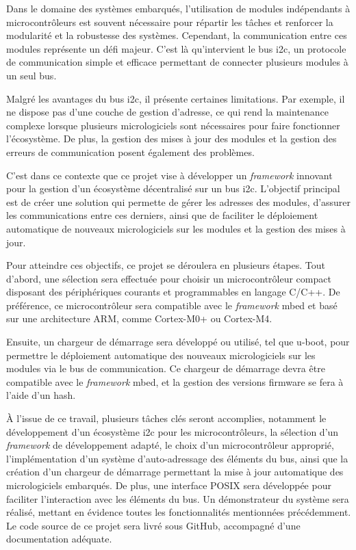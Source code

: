 Dans le domaine des systèmes embarqués, l'utilisation de modules indépendants à microcontrôleurs est souvent nécessaire pour répartir les tâches et renforcer la modularité et la robustesse des systèmes.
Cependant, la communication entre ces modules représente un défi majeur.
C'est là qu'intervient le bus \gls{i2c}, un protocole de communication simple et efficace permettant de connecter plusieurs modules à un seul bus.

Malgré les avantages du bus \gls{i2c}, il présente certaines limitations.
Par exemple, il ne dispose pas d'une couche de gestion d'adresse, ce qui rend la maintenance complexe lorsque plusieurs micrologiciels sont nécessaires pour faire fonctionner l'écosystème.
De plus, la gestion des mises à jour des modules et la gestion des erreurs de communication posent également des problèmes.

C'est dans ce contexte que ce projet vise à développer un \textit{\gls{framework}} innovant pour la gestion d'un écosystème décentralisé sur un bus \gls{i2c}.
L'objectif principal est de créer une solution qui permette de gérer les adresses des modules, d'assurer les communications entre ces derniers, ainsi que de faciliter le déploiement automatique de nouveaux micrologiciels sur les modules et la gestion des mises à jour.

Pour atteindre ces objectifs, ce projet se déroulera en plusieurs étapes.
Tout d'abord, une sélection sera effectuée pour choisir un microcontrôleur compact disposant des périphériques courants et programmables en langage C/C++.
De préférence, ce microcontrôleur sera compatible avec le \textit{\gls{framework}} mbed et basé sur une architecture ARM, comme Cortex-M0+ ou Cortex-M4.

Ensuite, un chargeur de démarrage sera développé ou utilisé, tel que u-boot, pour permettre le déploiement automatique des nouveaux micrologiciels sur les modules via le bus de communication.
Ce chargeur de démarrage devra être compatible avec le \textit{\gls{framework}} mbed, et la gestion des versions firmware se fera à l'aide d'un hash.

À l'issue de ce travail, plusieurs tâches clés seront accomplies, notamment le développement d'un écosystème \gls{i2c} pour les microcontrôleurs, la sélection d'un \textit{\gls{framework}} de développement adapté, le choix d'un microcontrôleur approprié, l'implémentation d'un système d'auto-adressage des éléments du bus, ainsi que la création d'un chargeur de démarrage permettant la mise à jour automatique des micrologiciels embarqués.
De plus, une interface POSIX sera développée pour faciliter l'interaction avec les éléments du bus.
Un démonstrateur du système sera réalisé, mettant en évidence toutes les fonctionnalités mentionnées précédemment.
Le code source de ce projet sera livré sous GitHub, accompagné d'une documentation adéquate.

